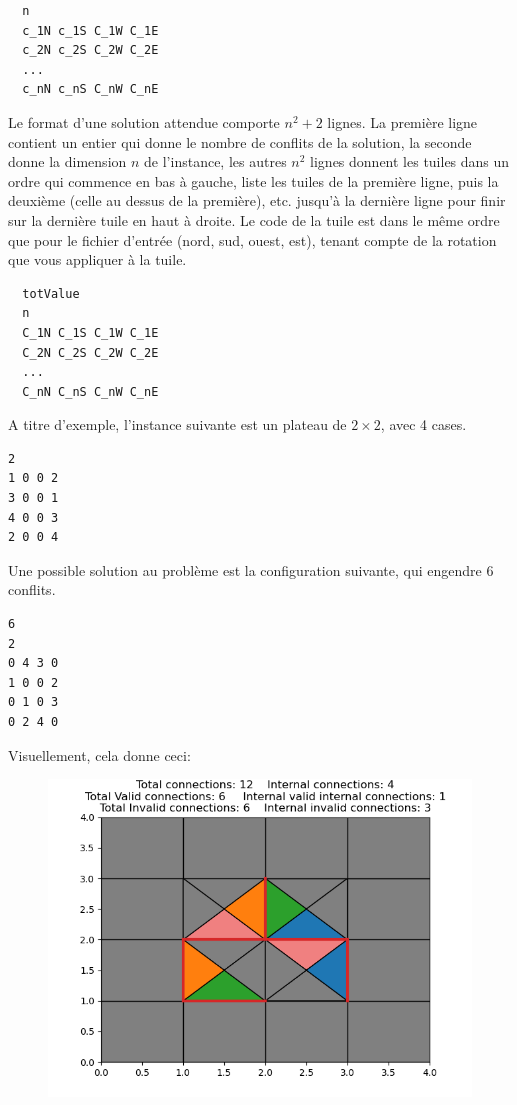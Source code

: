 \documentclass[a4paper,11pt,final,fleqn]{article}
\begin{document}
\begin{lstlisting}
  n
  c_1N c_1S C_1W C_1E
  c_2N c_2S C_2W C_2E
  ...
  c_nN c_nS C_nW C_nE
\end{lstlisting}

Le format d'une solution attendue comporte $n^2+2$ lignes. 
La première ligne contient un entier qui donne le nombre de conflits de la solution, la seconde donne la dimension $n$ de l'instance, 
les autres $n^2$ lignes donnent les tuiles dans un ordre qui commence en bas à gauche, liste les tuiles de la première ligne, puis la deuxième 
(celle au dessus de la première), etc. jusqu'à la dernière ligne pour finir sur la dernière tuile en haut à droite. Le code de la tuile est dans le 
même ordre que pour le fichier d'entrée (nord, sud, ouest, est), tenant compte de la rotation que vous appliquer à la tuile.
\begin{lstlisting}
  totValue
  n
  C_1N C_1S C_1W C_1E
  C_2N C_2S C_2W C_2E
  ...
  C_nN C_nS C_nW C_nE
\end{lstlisting}

A titre d'exemple, l'instance suivante est un plateau de $2 \times 2$, avec 4 cases.

\begin{lstlisting}
2
1 0 0 2
3 0 0 1
4 0 0 3
2 0 0 4
\end{lstlisting}

Une possible solution au problème est la configuration suivante, qui engendre 6 conflits. 
\begin{lstlisting}
6
2
0 4 3 0 
1 0 0 2 
0 1 0 3 
0 2 4 0 
\end{lstlisting}

Visuellement, cela donne ceci:

\begin{figure}[!ht]
\centering
\includegraphics[scale=0.4]{img/eternity_ex}
\end{figure}
\end{document}

